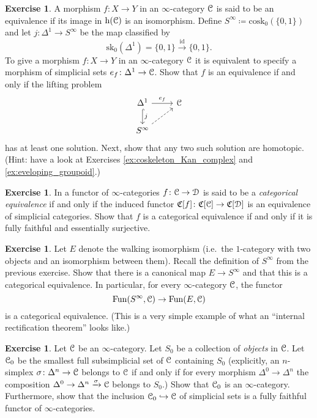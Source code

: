 \documentclass[10pt,a4paper,reqno,oneside]{book} %
\theoremstyle{plain}
\theoremstyle{definition}
\newtheorem{exercise}[thm]{Exercise}
\theoremstyle{remark}
\numberwithin{equation}{section}
\begin{document}
\begin{exercise} \label{ex:equivalences_S_infty}
	A morphism $f \colon X \to Y$ in an $\infty$-category $\mathcal C$ is said to be an equivalence if its image in $\mathrm h(\mathcal C)$ is an isomorphism.
	Define $S^\infty \coloneqq \mathrm{cosk}_0(\{0,1\})$ and let $j \colon \Delta^1 \to S^\infty$ be the map classified by
	\[ \mathrm{sk}_0(\Delta^1) = \{0,1\} \xrightarrow{\mathrm{id}} \{0,1\} . \]
	To give a morphism $f \colon X \to Y$ in an $\infty$-category $\mathcal C$ it is equivalent to specify a morphism of simplicial sets $e_f \colon \Delta^1 \to \mathcal C$.
	Show that $f$ is an equivalence if and only if the lifting problem
	\[ \begin{tikzcd}
		\Delta^1 \arrow[hook]{d}{j} \arrow{r}{e_f} & \cC \\
		S^\infty \arrow[dashed]{ur}
	\end{tikzcd} \]
	has at least one solution.
	Next, show that any two such solution are homotopic.
	(Hint: have a look at Exercises \ref{ex:coskeleton_Kan_complex} and \ref{ex:eveloping_groupoid}.)
\end{exercise}

\begin{exercise}
	In \cite{HTT} a functor of $\infty$-categories $f \colon \mathcal C \to \mathcal D$ is said to be a \emph{categorical equivalence} if and only if the induced functor $\mathfrak C[f] \colon \mathfrak C[\mathcal C] \to \mathfrak C[\mathcal D]$ is an equivalence of simplicial categories.
	Show that $f$ is a categorical equivalence if and only if it is fully faithful and essentially surjective.
\end{exercise}

\begin{exercise}
	Let $E$ denote the walking isomorphism (i.e.\ the $1$-category with two objects and an isomorphism between them).
	Recall the definition of $S^\infty$ from the previous exercise.
	Show that there is a canonical map $E \to S^\infty$ and that this is a categorical equivalence.
	In particular, for every $\infty$-category $\mathcal C$, the functor
	\[ \operatorname{Fun}(S^\infty, \mathcal C) \to \operatorname{Fun}(E, \mathcal C) \]
	is a categorical equivalence.
	(This is a very simple example of what an ``internal rectification theorem'' looks like.)
\end{exercise}

\begin{exercise}
	Let $\mathcal C$ be an $\infty$-category.
	Let $S_0$ be a collection of \emph{objects} in $\mathcal C$.
	Let $\mathcal C_0$ be the smallest full subsimplicial set of $\mathcal C$ containing $S_0$ (explicitly, an $n$-simplex $\sigma \colon \Delta^n \to \mathcal C$ belongs to $\mathcal C$ if and only if for every morphism $\Delta^0 \to \Delta^n$ the composition $\Delta^0 \to \Delta^n \xrightarrow{\sigma} \mathcal C$ belongs to $S_0$.)
	Show that $\mathcal C_0$ is an $\infty$-category.
	Furthermore, show that the inclusion $\mathcal C_0 \hookrightarrow \mathcal C$ of simplicial sets is a fully faithful functor of $\infty$-categories.
\end{exercise}
\end{document}
